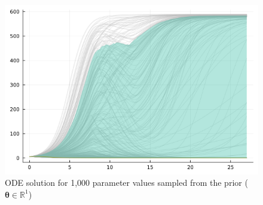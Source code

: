 \documentclass[11pt]{article}
\begin{document}
    \begin{figure}[!ht]
        \centering\includegraphics[scale=0.4]{prout1.png}
        \caption{ODE solution for 1,000 parameter values sampled from the prior ($\boldsymbol{\theta} \in \mathbb{R}^1$)}
        \label{fig:ppc_1}
    \end{figure}
\end{document}
